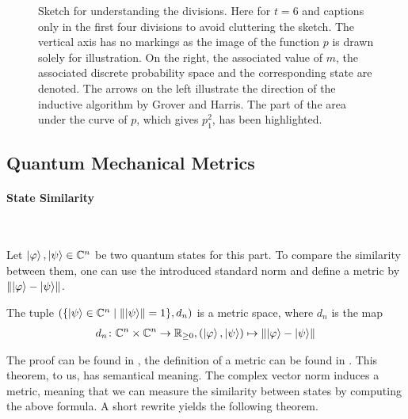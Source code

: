 \begin{figure}[!hbtp]
    \caption{Sketch for understanding the divisions. Here for \(t = 6\) and captions only in the first four divisions to avoid cluttering the sketch. The vertical axis has no markings as the image of the function \(p\) is drawn solely for illustration. On the right, the associated value of \(m\), the associated discrete probability space and the corresponding state are denoted. The arrows on the left illustrate the direction of the inductive algorithm by Grover and Harris. The part of the area under the curve of \(p\), which gives \(p_1^2\), has been highlighted.}
\end{figure}

\subsection{Quantum Mechanical Metrics }

\paragraph*{State Similarity} \phantom{}\\\phantom{}

Let \(\ket{\varphi}, \ket{\psi} \in \mathbb{C}^n\) be two quantum states for this part. To compare the similarity between them, one can use the introduced standard norm and define a metric by \(\norm{\ket{\varphi}-\ket{\psi}}\).

\begin{theorem}
    The tuple \((\{\ket{\psi} \in \mathbb{C}^n \mid \norm{\ket{\psi}} = 1\}, d_n)\) is a metric space, where \(d_n\) is the map
    \begin{align}
        d_n \colon \mathbb{C}^n \times \mathbb{C}^n \to \mathbb{R}_{\geq 0}, (\ket{\varphi}, \ket{\psi}) \mapsto \norm{\ket{\varphi}-\ket{\psi}}
    \end{align}
\end{theorem}

The proof can be found in \cite[p. 1-2]{Werner2018}, the definition of a metric can be found in \cite[p. 551]{Werner2018}. This theorem, to us, has semantical meaning. The complex vector norm induces a metric, meaning that we can measure the similarity between states by computing the above formula. A short rewrite yields the following theorem.

